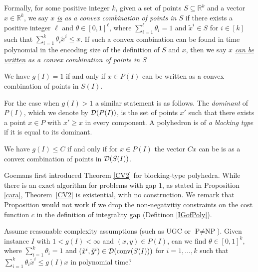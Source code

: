 Formally, for some positive integer $k$, given a set of points $S\subseteq \mathbb{R}^k$ and a vector $x\in \mathbb{R}^k$, we say \textit{$x$ \underline{is} as a convex combination of points in $S$} if there exists a positive integer $\ell$ and $\theta \in [0,1]^\ell$, where $\sum_{i=1}^{\ell}\theta_i =1$ and $\tilde{x}^i\in S$ for $i\in [k]$ such that $\sum_{i=1}^{k}\theta_i \tilde{x}^i\leq x$. If such a convex combination can be found in time polynomial in the encoding size of the definition of $S$ and $x$, then we say  \textit{$x$ \underline{can be written} as a convex combination of points in $S$}

\begin{proposition}\label{cara}
	We have $g(I)=1$ if and only if $x\in P(I)$ can be written as a convex combination of points in $S(I)$.
\end{proposition}

For the case when $g(I)>1$ a similar statement is as follows. The {\em dominant} of $P(I)$, which we denote by $\operatorname{\mathcal{D}}(P(I))$, is the set of points $x'$ such that there exists a point $x\in P$ with $x'\geq x$ in every component. A polyhedron is of \textit{a blocking type} if it is equal to its dominant.

\begin{thm} \label{CV2}
	We have $g(I) \leq C$ if and only if for $x\in P(I)$ the vector $Cx$ can be is as a convex combination of points in $\operatorname{\mathcal{D}}(S(I))$. 
\end{thm}
Goemans \cite{goemansblocking} first introduced Theorem \ref{CV2} for blocking-type polyhedra. While there is an exact algorithm for problems with gap $1$, as stated in Proposition \ref{cara}, Theorem~\ref{CV2} is existential, with no construction. We remark that Proposition \label{CV2} would not work if we drop the non-negatvitiy constraints on the cost function $c$ in the definition of integrality gap (Defitinon \ref{IGofPoly}).
\iffalse

\begin{question*}\label{question1}
	Assume reasonable complexity assumptions (such as UGC or $\textrm{P}\neq \textrm{NP}$). Given instance $I$ with $1<g(I)<\infty$ and $(x,y)\in P(I)$, can we find $\theta \in [0,1]^k$, where $\sum_{i=1}^{k}\theta_i =1$ and $(\tilde{x}^i,\tilde{y}^i)\in \operatorname{\mathcal{D}}(\operatorname{conv}(S(I)))$ for $i=1,\ldots,k$ such that $\sum_{i=1}^{k}\theta_i \tilde{x}^i\leq g(I)x$ in polynomial time?
\end{question*}

